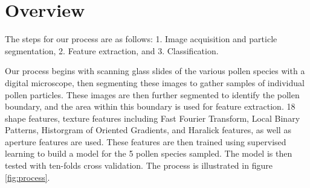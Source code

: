 \section{Overview} 

The steps for our process are as follows: 1. Image acquisition and particle segmentation, 2. Feature extraction, and 3. Classification.

Our process begins with scanning glass slides of the various pollen species with a digital microscope, then segmenting these images to gather samples of individual pollen particles. These images are then further segmented to identify the pollen boundary, and the area within this boundary is used for feature extraction. 18 shape features, texture features including Fast Fourier Transform, Local Binary Patterns, Historgram of Oriented Gradients, and Haralick features, as well as aperture features are used. These features are then trained using supervised learning to build a model for the 5 pollen species sampled. The model is then tested with ten-folds cross validation. The process is illustrated in figure \ref{fig:process}. 
    
    
    
    
    
    
    
    
    
    
    
    
  
  
  
  
  
  
  
  
  
  
  
  
  
  